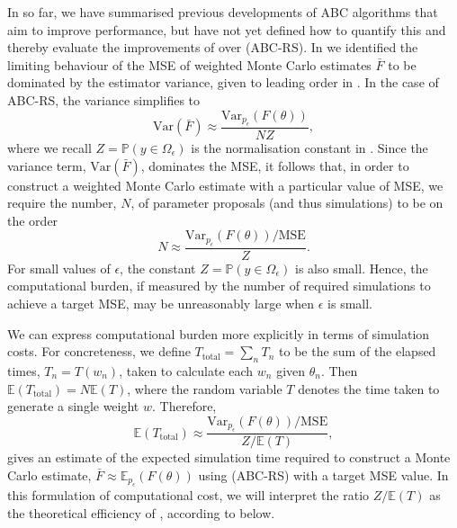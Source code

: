 \documentclass[12pt, onecolumn]{article}
\begin{document}
In  so far, we have summarised previous developments of ABC algorithms that aim to improve performance, but have not yet defined how to quantify this and thereby evaluate the improvements of  over  (ABC-RS).
In  we identified the limiting behaviour of the MSE of weighted Monte Carlo estimates $\bar F$ to be dominated by the estimator variance, given to leading order in .
In the case of ABC-RS, the variance simplifies to
\begin{equation}
\label{eq:ABCRSVariance}
\mathrm{Var} \left( \bar F \right) 
\approx
\frac{\mathrm{Var}_{p_\epsilon} (F(\theta))}{NZ},
\end{equation}
where we recall $Z = \mathbb P(y \in \Omega_\epsilon)$ is the normalisation constant in .
Since the variance term, $\mathrm{Var} \left( \bar F \right)$, dominates the MSE, it follows that, in order to construct a weighted Monte Carlo estimate with a particular value of MSE, we require the number, $N$, of parameter proposals (and thus simulations) to be on the order
\[
N \approx \frac{\mathrm{Var}_{p_\epsilon} (F(\theta)) / \mathrm{MSE} }{Z}.
\]
For small values of $\epsilon$, the constant $Z = \mathbb P(y \in \Omega_\epsilon)$ is also small. 
Hence, the computational burden, if measured by the number of required simulations to achieve a target MSE, may be unreasonably large when $\epsilon$ is small.

We can express computational burden more explicitly in terms of simulation costs.
For concreteness, we define $T_{\mathrm{total}} = \sum_n T_n$ to be the sum of the elapsed times, $T_n = T(w_n)$, taken to calculate each $w_n$ given $\theta_n$.
Then $\mathbb E(T_{\mathrm{total}}) = N \mathbb E(T)$, where the random variable $T$ denotes the time taken to generate a single weight $w$.
Therefore,
\[
\mathbb E(T_{\mathrm{total}}) 
\approx
\frac{\mathrm{Var}_{p_\epsilon} (F(\theta)) / \mathrm{MSE} }{Z / \mathbb E(T)},
\]
gives an estimate of the expected simulation time required to construct a Monte Carlo estimate, $\bar F \approx \mathbb E_{p_\epsilon}(F(\theta))$ using  (ABC-RS) with a target MSE value.
In this formulation of computational cost, we will interpret the ratio $Z/\mathbb E(T)$ as the theoretical efficiency of , according to  below.
\end{document}
